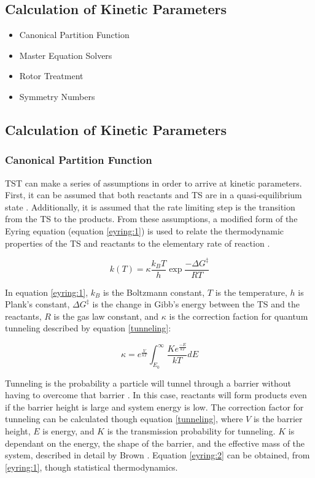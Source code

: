 \documentclass[preprint, 11pt]{elsarticle} %
\begin{document}
\subsection{Calculation of Kinetic Parameters}
\begin{itemize}
    \item Canonical Partition Function
    \item Master Equation Solvers
    \item Rotor Treatment
    \item Symmetry Numbers
    
\end{itemize}

\subsection{Calculation of Kinetic Parameters}

\subsubsection{Canonical Partition Function}

TST can make a series of assumptions in order to arrive at kinetic parameters. 
First, it can be assumed that both reactants and TS are in a quasi-equilibrium state \cite{QSS:2017}.
Additionally, it is assumed that the rate limiting step is the transition from the TS to the products. 
From these assumptions, a modified form of the Eyring equation (equation \ref{eyring:1}) is used to relate the thermodynamic properties of the TS and reactants to the elementary rate of reaction \cite{eyring:1935}.

\begin{equation}
    k(T) = \kappa \frac{k_B T}{h} \exp{\frac{-\Delta G^\ddagger}{RT}}
    \label{eyring:1}
\end{equation}

In equation \ref{eyring:1}, $k_B$ is the Boltzmann constant, $T$ is the temperature, $h$ is Plank's constant, $\Delta G^\ddagger$ is the change in Gibb's energy between the TS and the reactants,  $R$ is the gas law constant, and $\kappa$ is the correction faction for quantum tunneling described by equation \ref{tunneling}:

\begin{equation}
    \kappa = e^{\frac{V}{kT}} \int^{\infty}_{E_0} \frac{K e^{\frac{-E}{kT}}}{kT} dE
    \label{tunneling}
\end{equation}

Tunneling is the probability a particle will tunnel through a barrier without having to overcome that barrier \cite{RUBAKOV:1984}.
In this case, reactants will form products even if the barrier height is large and system energy is low. 
The correction factor for tunneling can be calculated though equation \ref{tunneling}, where $V$ is the barrier height, $E$ is energy, and $K$ is the transmission probability for tunneling.
$K$ is dependant on the energy, the shape of the barrier, and the effective mass of the system, described in detail by Brown \cite{Brown:1981}.
Equation \ref{eyring:2} can be obtained, from \ref{eyring:1}, though statistical thermodynamics.
\end{document}
